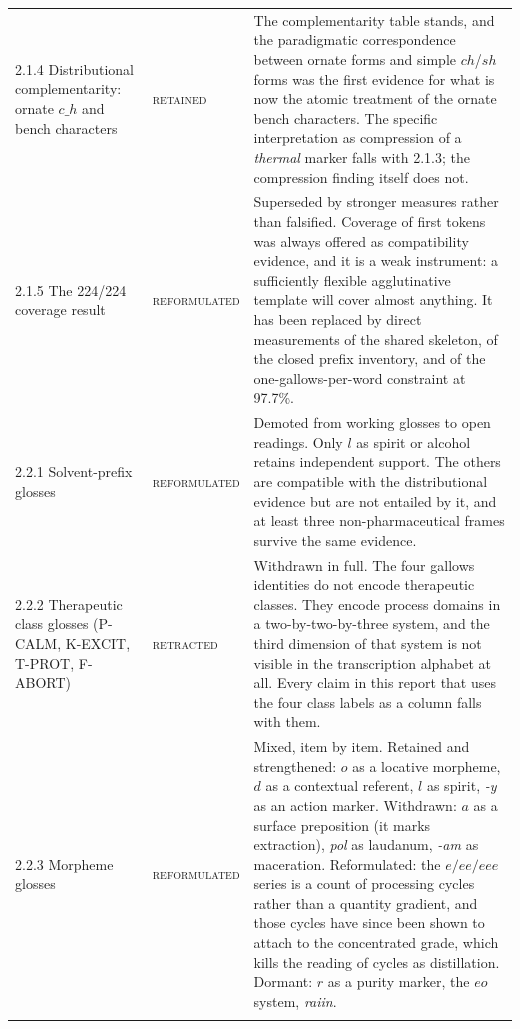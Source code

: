 \documentclass[11pt,a4paper]{article}
\newcommand{\keep}{\textsc{retained}}
\newcommand{\reform}{\textsc{reformulated}}
\newcommand{\retract}{\textcolor{red!65!black}{\textsc{retracted}}}
\begin{document}
\begin{longtable}{@{}p{4.9cm}p{2.4cm}p{7.6cm}@{}}
2.1.4 Distributional complementarity: ornate $c\_h$ and bench characters & \keep{} &
The complementarity table stands, and the paradigmatic correspondence between ornate forms and
simple $ch$/$sh$ forms was the first evidence for what is now the atomic treatment of the ornate
bench characters. The specific interpretation as compression of a \emph{thermal} marker falls with
2.1.3; the compression finding itself does not. \\
\addlinespace

2.1.5 The 224/224 coverage result & \reform{} &
Superseded by stronger measures rather than falsified. Coverage of first tokens was always offered
as compatibility evidence, and it is a weak instrument: a sufficiently flexible agglutinative
template will cover almost anything. It has been replaced by direct measurements of the shared
skeleton, of the closed prefix inventory, and of the one-gallows-per-word constraint at 97.7\%. \\
\addlinespace

2.2.1 Solvent-prefix glosses & \reform{} &
Demoted from working glosses to open readings. Only $l$ as spirit or alcohol retains independent
support. The others are compatible with the distributional evidence but are not entailed by it,
and at least three non-pharmaceutical frames survive the same evidence. \\
\addlinespace

2.2.2 Therapeutic class glosses (P-CALM, K-EXCIT, T-PROT, F-ABORT) & \retract{} &
Withdrawn in full. The four gallows identities do not encode therapeutic classes. They encode
process domains in a two-by-two-by-three system, and the third dimension of that system is not
visible in the transcription alphabet at all. Every claim in this report that uses the four class
labels as a column falls with them. \\
\addlinespace

2.2.3 Morpheme glosses & \reform{} &
Mixed, item by item. Retained and strengthened: $o$ as a locative morpheme, $d$ as a contextual
referent, $l$ as spirit, \textit{-y} as an action marker. Withdrawn: $a$ as a surface preposition
(it marks extraction), \textit{pol} as laudanum, \textit{-am} as maceration. Reformulated: the
$e/ee/eee$ series is a count of processing cycles rather than a quantity gradient, and those cycles
have since been shown to attach to the concentrated grade, which kills the reading of cycles as
distillation. Dormant: $r$ as a purity marker, the $eo$ system, \textit{raiin}. \\
\addlinespace


\end{longtable}
\end{document}
